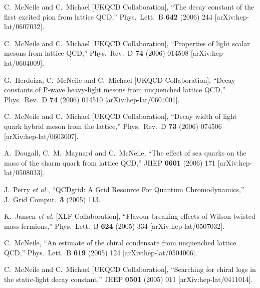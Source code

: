 \begin{thebibliography}{130}
  C.~McNeile and C.~Michael  [UKQCD Collaboration],
  ``The decay constant of the first excited pion from lattice QCD,''
  Phys.\ Lett.\ B {\bf 642} (2006) 244
  [arXiv:hep-lat/0607032].

  C.~McNeile and C.~Michael  [UKQCD Collaboration],
  ``Properties of light scalar mesons from lattice QCD,''
  Phys.\ Rev.\ D {\bf 74} (2006) 014508
  [arXiv:hep-lat/0604009].

  G.~Herdoiza, C.~McNeile and C.~Michael  [UKQCD Collaboration],
  ``Decay constants of P-wave heavy-light mesons from unquenched lattice
  QCD,''
  Phys.\ Rev.\ D {\bf 74} (2006) 014510
  [arXiv:hep-lat/0604001].

  C.~McNeile and C.~Michael  [UKQCD Collaboration],
  ``Decay width of light quark hybrid meson from the lattice,''
  Phys.\ Rev.\ D {\bf 73} (2006) 074506
  [arXiv:hep-lat/0603007].

  A.~Dougall, C.~M.~Maynard and C.~McNeile,
  ``The effect of sea quarks on the mass of the charm quark from lattice
  QCD,''
  JHEP {\bf 0601} (2006) 171
  [arXiv:hep-lat/0508033].

  J.~Perry {\it et al.},
  ``QCDgrid: A Grid Resource For Quantum Chromodynamics,''
  J.\ Grid Comput.\  {\bf 3} (2005) 113.

K.~Jansen {\it et al.}  [XLF Collaboration],
``Flavour breaking effects of Wilson twisted mass fermions,''
Phys.\ Lett.\ B {\bf 624} (2005) 334
[arXiv:hep-lat/0507032].


C.~McNeile,
``An estimate of the chiral condensate from unquenched lattice QCD,''
Phys.\ Lett.\ B {\bf 619} (2005) 124
[arXiv:hep-lat/0504006].


C.~McNeile and C.~Michael  [UKQCD Collaboration],
``Searching for chiral logs in the static-light decay constant,''
JHEP {\bf 0501} (2005) 011
[arXiv:hep-lat/0411014].



\end{thebibliography}
